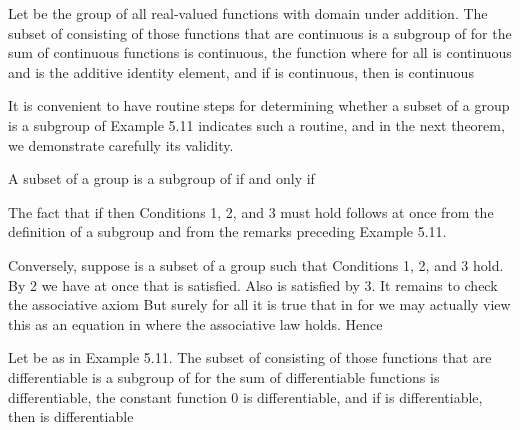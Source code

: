 \documentclass[11pt,oneside]{article}
\begin{document}
\begin{BookBody}

 Let  be the group of all real-valued functions with domain  under addition. The subset of  consisting of those functions that are continuous is a subgroup of  for the sum of continuous functions is continuous, the function  where  for all  is continuous and is the additive identity element, and if  is continuous, then  is continuous\BookEnd{\blacktriangle}

It is convenient to have routine steps for determining whether a subset of a group  is a subgroup of  Example 5.11 indicates such a routine, and in the next theorem, we demonstrate carefully its validity.

 A subset  of a group  is a subgroup of  if and only if




 The fact that if  then Conditions 1, 2, and 3 must hold follows at once from the definition of a subgroup and from the remarks preceding Example 5.11.

Conversely, suppose  is a subset of a group  such that Conditions 1, 2, and 3 hold. By 2 we have at once that  is satisfied. Also  is satisfied by 3. It remains to check the associative axiom But surely for all  it is true that   in  for we may actually view this as an equation in  where the associative law holds. Hence \BookEnd{\blacklozenge}

 Let  be as in Example 5.11. The subset of  consisting of those functions that are differentiable is a subgroup of  for the sum of differentiable functions is differentiable, the constant function 0 is differentiable, and if  is differentiable, then  is differentiable\BookEnd{\blacktriangle}


\end{BookBody}
\end{document}
